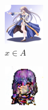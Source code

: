 \documentclass[twocolumn,11pt]{ctexart}
\begin{document}
\begin{figure}[htb]
    \centering
    \begin{subfigure}[b]{0.23\linewidth}
        \includegraphics[width=\linewidth]{exp3_epoch194_real_A.png}
        \caption{$x \in A$}
      \end{subfigure}
      \begin{subfigure}[b]{0.23\linewidth}
        \includegraphics[width=\linewidth]{exp3_epoch194_fake_B.png}

\end{subfigure}
\end{figure}
\end{document}
